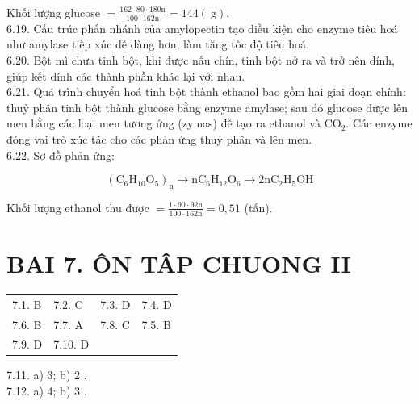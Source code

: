 \documentclass[10pt]{article}
\begin{document}
Khối lượng glucose $=\frac{162 \cdot 80 \cdot 180 \mathrm{n}}{100 \cdot 162 \mathrm{n}}=144(\mathrm{~g})$.\\
6.19. Cấu trúc phấn nhánh của amylopectin tạo điều kiện cho enzyme tiêu hoá như amylase tiếp xúc dễ dàng hơn, làm tăng tốc độ tiêu hoá.\\
6.20. Bột mì chưa tinh bột, khi được nấu chín, tinh bột nở ra và trở nên dính, giúp kết dính các thành phần khác lại với nhau.\\
6.21. Quá trình chuyển hoá tinh bột thành ethanol bao gồm hai giai đoạn chính: thuỷ phân tinh bột thành glucose bằng enzyme amylase; sau đó glucose được lên men bằng các loại men tương ứng (zymas) đề tạo ra ethanol và $\mathrm{CO}_{2}$. Các enzyme đóng vai trò xúc tác cho các phản ứng thuỷ phân và lên men.\\
6.22. Sơ đồ phản ứng:

$$
\left(\mathrm{C}_{6} \mathrm{H}_{10} \mathrm{O}_{5}\right)_{\mathrm{n}} \rightarrow \mathrm{nC}_{6} \mathrm{H}_{12} \mathrm{O}_{6} \rightarrow 2 \mathrm{nC}_{2} \mathrm{H}_{5} \mathrm{OH}
$$

Khối lượng ethanol thu được $=\frac{1 \cdot 90 \cdot 92 \mathrm{n}}{100 \cdot 162 \mathrm{n}}=0,51$ (tấn).

\section*{BAI 7. ÔN TÂP CHUONG II}
\begin{center}
\begin{tabular}{llll}
7.1. B & 7.2. C & 7.3. D & 7.4. D \\
7.6. B & 7.7. A & 7.8. C & 7.5. B \\
7.9. D & 7.10. D &  &  \\
\end{tabular}
\end{center}

7.11. a) 3; b) 2 .\\
7.12. a) 4; b) 3 .
\end{document}
